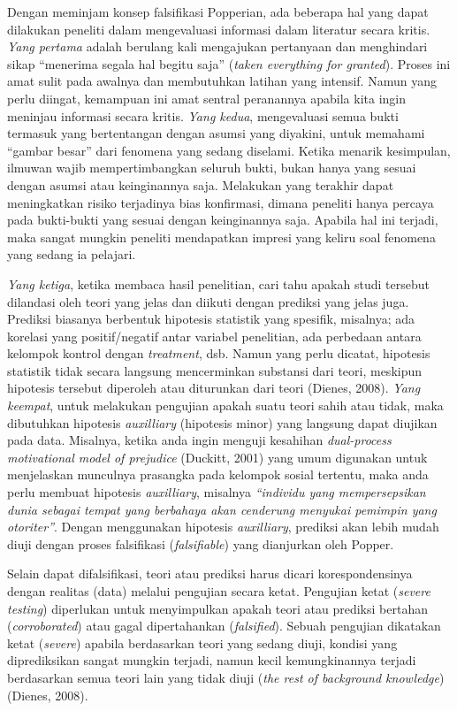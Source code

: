 \documentclass[
  english,
  man]{apa6}
\begin{document}
Dengan meminjam konsep falsifikasi Popperian, ada beberapa hal yang dapat dilakukan peneliti dalam mengevaluasi informasi dalam literatur secara kritis. \emph{Yang pertama} adalah berulang kali mengajukan pertanyaan dan menghindari sikap \enquote{menerima segala hal begitu saja} (\emph{taken everything for granted}). Proses ini amat sulit pada awalnya dan membutuhkan latihan yang intensif. Namun yang perlu diingat, kemampuan ini amat sentral peranannya apabila kita ingin meninjau informasi secara kritis. \emph{Yang kedua}, mengevaluasi semua bukti termasuk yang bertentangan dengan asumsi yang diyakini, untuk memahami \enquote{gambar besar} dari fenomena yang sedang diselami. Ketika menarik kesimpulan, ilmuwan wajib mempertimbangkan seluruh bukti, bukan hanya yang sesuai dengan asumsi atau keinginannya saja. Melakukan yang terakhir dapat meningkatkan risiko terjadinya bias konfirmasi, dimana peneliti hanya percaya pada bukti-bukti yang sesuai dengan keinginannya saja. Apabila hal ini terjadi, maka sangat mungkin peneliti mendapatkan impresi yang keliru soal fenomena yang sedang ia pelajari.

\emph{Yang ketiga}, ketika membaca hasil penelitian, cari tahu apakah studi tersebut dilandasi oleh teori yang jelas dan diikuti dengan prediksi yang jelas juga. Prediksi biasanya berbentuk hipotesis statistik yang spesifik, misalnya; ada korelasi yang positif/negatif antar variabel penelitian, ada perbedaan antara kelompok kontrol dengan \emph{treatment}, dsb. Namun yang perlu dicatat, hipotesis statistik tidak secara langsung mencerminkan substansi dari teori, meskipun hipotesis tersebut diperoleh atau diturunkan dari teori (Dienes, 2008). \emph{Yang keempat}, untuk melakukan pengujian apakah suatu teori sahih atau tidak, maka dibutuhkan hipotesis \emph{auxilliary} (hipotesis minor) yang langsung dapat diujikan pada data. Misalnya, ketika anda ingin menguji kesahihan \emph{dual-process motivational model of prejudice} (Duckitt, 2001) yang umum digunakan untuk menjelaskan munculnya prasangka pada kelompok sosial tertentu, maka anda perlu membuat hipotesis \emph{auxilliary}, misalnya \emph{\enquote{individu yang mempersepsikan dunia sebagai tempat yang berbahaya akan cenderung menyukai pemimpin yang otoriter}}. Dengan menggunakan hipotesis \emph{auxilliary}, prediksi akan lebih mudah diuji dengan proses falsifikasi (\emph{falsifiable}) yang dianjurkan oleh Popper.

Selain dapat difalsifikasi, teori atau prediksi harus dicari korespondensinya dengan realitas (data) melalui pengujian secara ketat. Pengujian ketat (\emph{severe testing}) diperlukan untuk menyimpulkan apakah teori atau prediksi bertahan (\emph{corroborated}) atau gagal dipertahankan (\emph{falsified}). Sebuah pengujian dikatakan ketat (\emph{severe}) apabila berdasarkan teori yang sedang diuji, kondisi yang diprediksikan sangat mungkin terjadi, namun kecil kemungkinannya terjadi berdasarkan semua teori lain yang tidak diuji (\emph{the rest of background knowledge}) (Dienes, 2008).
\end{document}
